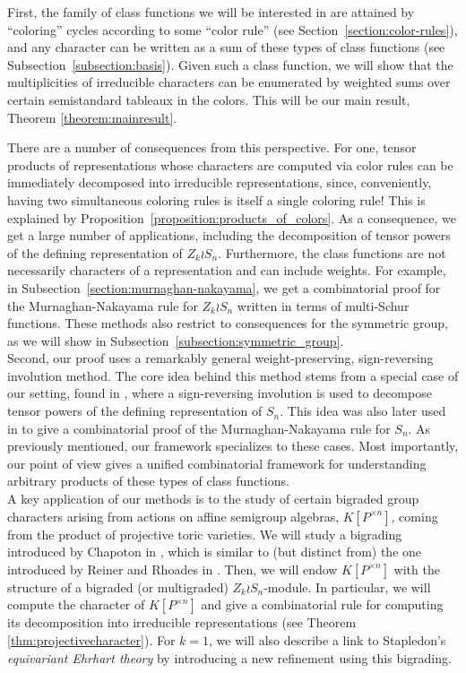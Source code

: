 \documentclass[a4paper,12pt]{amsart}
\theoremstyle{plain}
\theoremstyle{definition}
\theoremstyle{remark}
\begin{document}
First, the family of class functions we will be interested in are attained by ``coloring'' cycles according to some ``color rule'' (see Section~\ref{section:color-rules}), and any character can be written as a sum of these types of class functions (see Subsection~\ref{subsection:basis}). 
Given such a class function, we will show that the multiplicities of irreducible characters can be enumerated by weighted sums over certain semistandard tableaux in the colors. This will be our main result, Theorem \ref{theorem:mainresult}. 

There are a number of consequences from this perspective. For one, tensor products of representations whose characters are computed via color rules can be immediately decomposed into irreducible representations, since, conveniently, having two simultaneous coloring rules is itself a single coloring rule! This is explained by Proposition~\ref{proposition:products_of_colors}.
As a consequence, we get a large number of applications, including the decomposition of tensor powers of the defining representation of $Z_k \wr S_n$.
Furthermore, the class functions are not necessarily characters of a representation and can include weights.
For example,
in Subsection~\ref{section:murnaghan-nakayama}, we  get a combinatorial proof for the Murnaghan-Nakayama rule for $Z_k \wr S_n$ written in terms of multi-Schur functions.
These methods also restrict to consequences for the symmetric group, as we will show in Subsection~\ref{subsection:symmetric_group}.\\ 

Second, our proof uses a remarkably general weight-preserving, sign-reversing involution method.
The core idea behind this method stems from a special case of our setting, found in \cite{MendesRomero}, where a sign-reversing involution is used to decompose tensor powers of the defining representation of $S_n$. This idea was also later used in \cite{Mendes} to give a combinatorial proof of the Murnaghan-Nakayama rule for $S_n$. As previously mentioned, our framework specializes to these cases. Most importantly, our point of view gives a unified combinatorial framework for understanding arbitrary products of these types of class functions. \\

A key application of our methods is to the study of certain bigraded group characters arising from actions on affine semigroup algebras, $K[P^{\times n}]$, coming from the product of projective toric varieties. We will study a bigrading introduced by Chapoton in \cite{chapoton-analogues}, which is similar to (but distinct from) the one introduced by Reiner and Rhoades in \cite{reiner-rhoades-harmonics}. Then, we will endow $K[P^{\times n}]$ with the structure of a bigraded (or multigraded) $Z_k \wr S_n$-module. In particular, we will compute the character of $K[P^{\times n}]$ and give a combinatorial rule for computing its decomposition into irreducible representations (see Theorem \ref{thm:projectivecharacter}). 
For $k=1$, we will also describe a link to Stapledon's \emph{equivariant Ehrhart theory} \cite{stapledon-equivariant} by introducing a new refinement using this bigrading.
\end{document}
